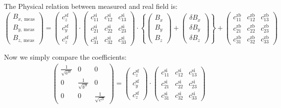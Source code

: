 The Physical relation between measured and real field is:
\begin{equation}
    \begin{pmatrix}
    B_{x,\ \mathrm{meas}} \\
    B_{y,\ \mathrm{meas}} \\
    B_{z,\ \mathrm{meas}}
    \end{pmatrix}
    =
    \begin{pmatrix}
        c^\mathrm{sf}_z \\
        c^\mathrm{sf}_y \\
        c^\mathrm{sf}_z
    \end{pmatrix}
    \cdot
    \begin{pmatrix}
        c^\mathrm{si}_{11} & c^\mathrm{si}_{12} & c^\mathrm{si}_{13} \\
        c^\mathrm{si}_{21} & c^\mathrm{si}_{22} & c^\mathrm{si}_{23} \\
        c^\mathrm{si}_{31} & c^\mathrm{si}_{32} & c^\mathrm{si}_{33} 
    \end{pmatrix}
    \cdot \left\{
    \begin{pmatrix}
    B_x \\ B_y \\ B_z
    \end{pmatrix}
    +\begin{pmatrix}
     \delta B_x \\
     \delta B_y \\
     \delta B_z   
    \end{pmatrix} 
    \right\}
    +\begin{pmatrix}
        c^{\mathrm{zb}}_{11} & c^{\mathrm{zb}}_{12} & c^{\mathrm{zb}}_{13} \\
        c^{\mathrm{zb}}_{21} & c^{\mathrm{zb}}_{22} & c^{\mathrm{zb}}_{23} \\
        c^{\mathrm{zb}}_{31} & c^{\mathrm{zb}}_{32} & c^{\mathrm{zb}}_{33}
    \end{pmatrix}
\end{equation}

Now we simply compare the coefficients:
\begin{align}
    \begin{pmatrix}
    \frac{1}{\sqrt{a^B}} & 0 & 0 \\
    0 & \frac{1}{\sqrt{b^B}} & 0 \\
    0 & 0 & \frac{1}{\sqrt{c^B}}
    \end{pmatrix}
    =
    \begin{pmatrix}
        c^\mathrm{sf}_z \\
        c^\mathrm{sf}_y \\
        c^\mathrm{sf}_z
    \end{pmatrix}
    \cdot
    \begin{pmatrix}
        c^\mathrm{si}_{11} & c^\mathrm{si}_{12} & c^\mathrm{si}_{13} \\
        c^\mathrm{si}_{21} & c^\mathrm{si}_{22} & c^\mathrm{si}_{23} \\
        c^\mathrm{si}_{31} & c^\mathrm{si}_{32} & c^\mathrm{si}_{33} 
    \end{pmatrix}
\end{align}
